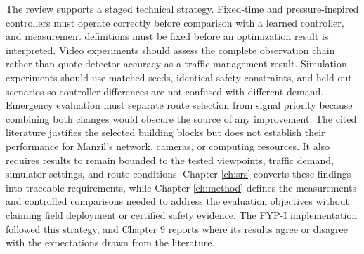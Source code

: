 The review supports a staged technical strategy. Fixed-time and pressure-inspired controllers must operate correctly before comparison with a learned controller, and measurement definitions must be fixed before an optimization result is interpreted. Video experiments should assess the complete observation chain rather than quote detector accuracy as a traffic-management result. Simulation experiments should use matched seeds, identical safety constraints, and held-out scenarios so controller differences are not confused with different demand. Emergency evaluation must separate route selection from signal priority because combining both changes would obscure the source of any improvement. The cited literature justifies the selected building blocks but does not establish their performance for Manzil's network, cameras, or computing resources. It also requires results to remain bounded to the tested viewpoints, traffic demand, simulator settings, and route conditions. Chapter \ref{ch:srs} converts these findings into traceable requirements, while Chapter \ref{ch:method} defines the measurements and controlled comparisons needed to address the evaluation objectives without claiming field deployment or certified safety evidence. The FYP-I implementation followed this strategy, and Chapter 9 reports where its results agree or disagree with the expectations drawn from the literature.
